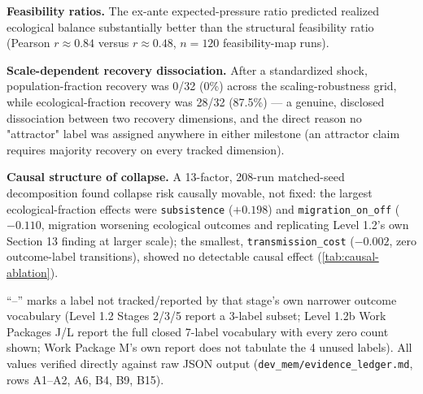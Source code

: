 \textbf{Feasibility ratios.} The ex-ante expected-pressure ratio predicted
realized ecological balance substantially better than the structural
feasibility ratio (Pearson $r\approx0.84$ versus $r\approx0.48$, $n=120$
feasibility-map runs).

\textbf{Scale-dependent recovery dissociation.} After a standardized
shock, population-fraction recovery was 0/32 (0\%) across the
scaling-robustness grid, while ecological-fraction recovery was 28/32
(87.5\%) --- a genuine, disclosed dissociation between two recovery
dimensions, and the direct reason no "attractor" label was assigned
anywhere in either milestone (an attractor claim requires majority
recovery on every tracked dimension).

\textbf{Causal structure of collapse.} A 13-factor, 208-run matched-seed
decomposition found collapse risk causally movable, not fixed: the
largest ecological-fraction effects were \texttt{subsistence} ($+0.198$)
and \texttt{migration\_on\_off} ($-0.110$, migration worsening ecological
outcomes and replicating Level 1.2's own Section 13 finding at larger
scale); the smallest, \texttt{transmission\_cost} ($-0.002$, zero
outcome-label transitions), showed no detectable causal effect
(\cref{tab:causal-ablation}).

\begin{table}[htbp]
\centering
\caption{Level 1.2 versus Level 1.2b: design comparison.}
\label{tab:l12-vs-l12b-design}
\end{table}

\begin{table}[htbp]
\centering
\caption{Total generative runs by experimental component.}
\label{tab:run-counts}
\end{table}

\begin{table}[htbp]
\centering
\caption{All-outcome label distribution by pooled run set. Every label is
always reported, including zero counts.}
\label{tab:outcome-distribution}

\medskip
\noindent\footnotesize ``--'' marks a label not tracked/reported by that
stage's own narrower outcome vocabulary (Level 1.2 Stages 2/3/5 report a
3-label subset; Level 1.2b Work Packages J/L report the full closed
7-label vocabulary with every zero count shown; Work Package M's own
report does not tabulate the 4 unused labels). All values verified
directly against raw JSON output (\texttt{dev\_mem/evidence\_ledger.md},
rows A1--A2, A6, B4, B9, B15).
\normalsize
\end{table}

